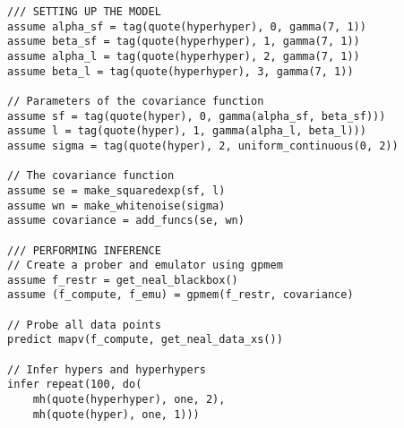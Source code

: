 \begin{mdframed}
\begin{minipage}{\linewidth}
\belowcaptionskip=-10pt
\begin{lstlisting}[mathescape,label=alg:gphierarch,basicstyle=\selectfont\ttfamily,numbers=none]
/// SETTING UP THE MODEL
assume alpha_sf = tag(quote(hyperhyper), 0, gamma(7, 1))
assume beta_sf = tag(quote(hyperhyper), 1, gamma(7, 1))
assume alpha_l = tag(quote(hyperhyper), 2, gamma(7, 1))
assume beta_l = tag(quote(hyperhyper), 3, gamma(7, 1))

// Parameters of the covariance function
assume sf = tag(quote(hyper), 0, gamma(alpha_sf, beta_sf)))
assume l = tag(quote(hyper), 1, gamma(alpha_l, beta_l)))
assume sigma = tag(quote(hyper), 2, uniform_continuous(0, 2)) 

// The covariance function
assume se = make_squaredexp(sf, l)
assume wn = make_whitenoise(sigma)
assume covariance = add_funcs(se, wn)

/// PERFORMING INFERENCE
// Create a prober and emulator using gpmem
assume f_restr = get_neal_blackbox()
assume (f_compute, f_emu) = gpmem(f_restr, covariance)

// Probe all data points
predict mapv(f_compute, get_neal_data_xs())

// Infer hypers and hyperhypers
infer repeat(100, do(
    mh(quote(hyperhyper), one, 2),
    mh(quote(hyper), one, 1)))

\end{lstlisting}
\end{minipage}
 
\end{mdframed}